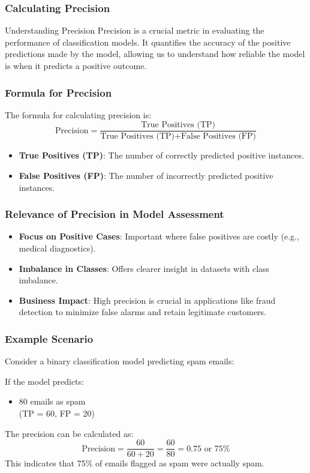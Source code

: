\documentclass[aspectratio=169]{beamer}
\begin{document}
\begin{frame}[fragile]
    \frametitle{Calculating Precision}
    \begin{block}{Understanding Precision}
        Precision is a crucial metric in evaluating the performance of classification models. It quantifies the accuracy of the positive predictions made by the model, allowing us to understand how reliable the model is when it predicts a positive outcome.
    \end{block}
\end{frame}

\begin{frame}[fragile]
    \frametitle{Formula for Precision}
    The formula for calculating precision is:
    \begin{equation}
        \text{Precision} = \frac{\text{True Positives (TP)}}{\text{True Positives (TP)} + \text{False Positives (FP)}}
    \end{equation}
    \begin{itemize}
        \item \textbf{True Positives (TP)}: The number of correctly predicted positive instances.
        \item \textbf{False Positives (FP)}: The number of incorrectly predicted positive instances.
    \end{itemize}
\end{frame}

\begin{frame}[fragile]
    \frametitle{Relevance of Precision in Model Assessment}
    \begin{itemize}
        \item \textbf{Focus on Positive Cases}: Important where false positives are costly (e.g., medical diagnostics).
        \item \textbf{Imbalance in Classes}: Offers clearer insight in datasets with class imbalance.
        \item \textbf{Business Impact}: High precision is crucial in applications like fraud detection to minimize false alarms and retain legitimate customers.
    \end{itemize}
\end{frame}

\begin{frame}[fragile]
    \frametitle{Example Scenario}
    Consider a binary classification model predicting spam emails:
    
    If the model predicts:
    \begin{itemize}
        \item 80 emails as spam \\
        (TP = 60, FP = 20)
    \end{itemize}
    The precision can be calculated as:
    \begin{equation}
        \text{Precision} = \frac{60}{60 + 20} = \frac{60}{80} = 0.75 \text{ or } 75\%
    \end{equation}
    This indicates that 75\% of emails flagged as spam were actually spam.
\end{frame}
\end{document}
